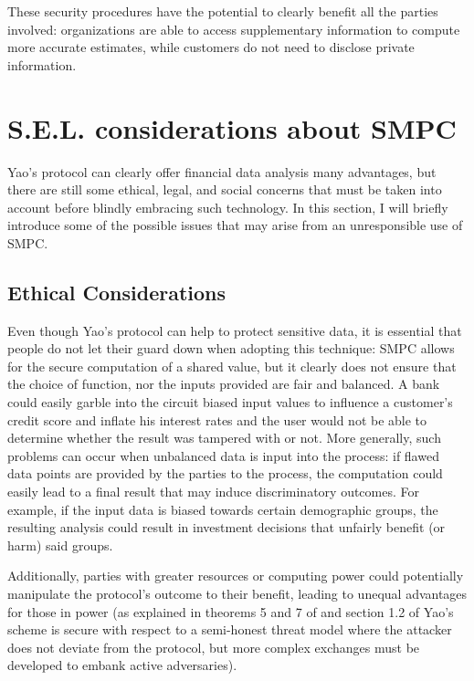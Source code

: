 \documentclass[12pt]{article}
\begin{document}
These security procedures have the potential to clearly benefit all the parties involved: organizations are able to access supplementary information to compute more accurate estimates, while customers do not need to disclose private information.

\section{S.E.L. considerations about SMPC}\label{sec:sel}

Yao's protocol can clearly offer financial data analysis many advantages, but there are still some ethical, legal, and social concerns that must be taken into account before blindly embracing such technology. In this section, I will briefly introduce some of the possible issues that may arise from an unresponsible use of SMPC.

\subsection{Ethical Considerations}

Even though Yao's protocol can help to protect sensitive data, it is essential that people do not let their guard down when adopting this technique: SMPC allows for the secure computation of a shared value, but it clearly does not ensure that the choice of function, nor the inputs provided are fair and balanced. A bank could easily garble into the circuit biased input values to influence a customer's credit score and inflate his interest rates and the user would not be able to determine whether the result was tampered with or not. More generally, such problems can occur when unbalanced data is input into the process: if flawed data points are provided by the parties to the process, the computation could easily lead to a final result that may induce discriminatory outcomes. For example, if the input data is biased towards certain demographic groups, the resulting analysis could result in investment decisions that unfairly benefit (or harm) said groups.

Additionally, parties with greater resources or computing power could potentially manipulate the protocol's outcome to their benefit, leading to unequal advantages for those in power (as explained in theorems 5 and 7 of \cite{attacks1} and section 1.2 of \cite{attacks2} Yao's scheme is secure with respect to a semi-honest threat model where the attacker does not deviate from the protocol, but more complex exchanges must be developed to embank active adversaries).
\end{document}
